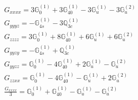 \documentclass[fleqn,8pt,landscape]{jsarticle}
\begin{document}
\begin{align*}
& G_{xxxx} = 3 \mathbb{G}_{0}^{(1)} + 3 \mathbb{G}_{40}^{(1)} - 3 \mathbb{G}_{u}^{(1)} - 3 \mathbb{G}_{u}^{(2)} \\
& G_{yyyz} = - \mathbb{G}_{4s}^{(1)} - 3 \mathbb{Q}_{3c}^{(1)} \\
& G_{zzzz} = 3 \mathbb{G}_{0}^{(1)} + 8 \mathbb{G}_{40}^{(1)} + 6 \mathbb{G}_{u}^{(1)} + 6 \mathbb{G}_{u}^{(2)} \\
& G_{yyzy} = - \mathbb{G}_{4s}^{(1)} + \mathbb{Q}_{3c}^{(1)} \\
& G_{yyzz} = \mathbb{G}_{0}^{(1)} - 4 \mathbb{G}_{40}^{(1)} + 2 \mathbb{G}_{u}^{(1)} - \mathbb{G}_{u}^{(2)} \\
& G_{zzxx} = \mathbb{G}_{0}^{(1)} - 4 \mathbb{G}_{40}^{(1)} - \mathbb{G}_{u}^{(1)} + 2 \mathbb{G}_{u}^{(2)} \\
& \frac{G_{xxxx}}{3} = \mathbb{G}_{0}^{(1)} + \mathbb{G}_{40}^{(1)} - \mathbb{G}_{u}^{(1)} - \mathbb{G}_{u}^{(2)}
\end{align*}
\end{document}
